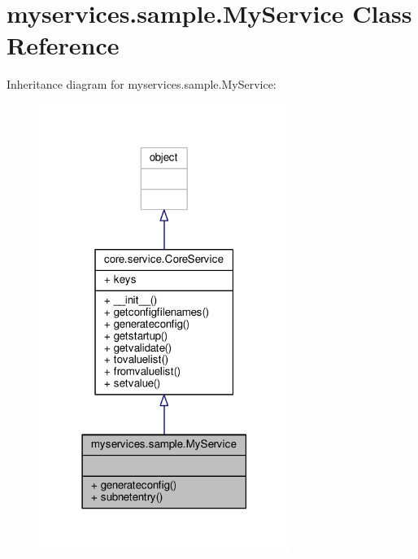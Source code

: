\hypertarget{classmyservices_1_1sample_1_1_my_service}{\section{myservices.\+sample.\+My\+Service Class Reference}
\label{classmyservices_1_1sample_1_1_my_service}
}


Inheritance diagram for myservices.\+sample.\+My\+Service\+:
\nopagebreak
\begin{figure}[H]
\begin{center}
\leavevmode
\includegraphics[width=231pt]{classmyservices_1_1sample_1_1_my_service__inherit__graph}
\end{center}
\end{figure}


